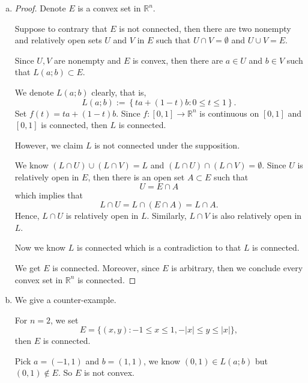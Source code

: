 \begin{Exercise}
\begin{enumerate}[a)]
\item
\begin{proof}
Denote $E$ is a convex set in $\mathbb{R}^n$. 

Suppose to contrary that $E$ is not connected, then there are two nonempty and relatively open sets $U$ and $V$ in $E$ such that $U\cap V = \emptyset$ and $U\cup V = E$.

Since $U,V$ are nonempty and $E$ is convex, then there are $a\in U$ and $b\in V$ such that $L(a;b)\subset E$.

We denote $L(a;b)$ clearly, that is,
$$
L(a;b) := \left\{t a + (1-t) b: 0\leq t \leq 1 \right\}.
$$
Set $f(t)=ta+(1-t)b$. Since $f:[0,1]\to \mathbb{R}^n$ is continuous on $[0,1]$ and $[0,1]$ is connected, then $L$ is connected.

However, we claim $L$ is not connected under the supposition.

We know $(L\cap U)\cup(L\cap V) = L$ and $(L\cap U)\cap(L\cap V) = \emptyset$. Since $U$ is relatively open in $E$, then there is an open set $A\subset E$ such that
$$
U = E\cap A
$$
which implies that
$$
L\cap U = L\cap(E\cap A) = L\cap A.
$$
Hence, $L\cap U$ is relatively open in $L$. Similarly, $L\cap V$ is also relatively open in $L$.

Now we know $L$ is connected which is a contradiction to that $L$ is connected.

We get $E$ is connected. Moreover, since $E$ is arbitrary, then we conclude every convex set in $\mathbb{R}^n$ is connected.
\end{proof}

\item
\begin{solution}
We give a counter-example.

For $n=2$, we set $$E = \{(x,y):-1\leq x \leq 1, -|x| \leq y \leq |x|\},$$ then $E$ is connected.

Pick $a=(-1,1)$ and $b=(1,1)$, we know $(0,1)\in L(a;b)$ but $(0,1)\notin E$. So $E$ is not convex.
\end{solution}
\end{enumerate}
\end{Exercise}
